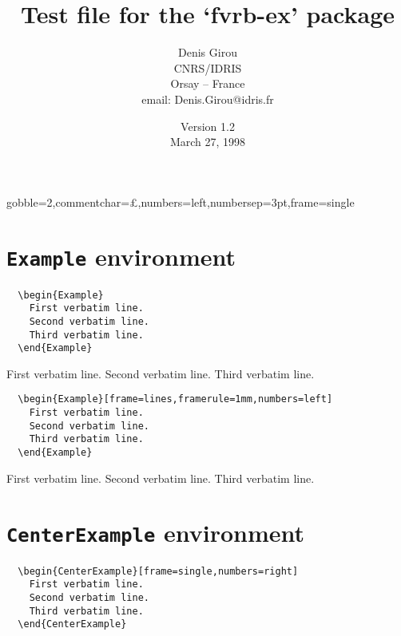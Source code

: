 \documentclass{article}
\begin{document}
\title{Test file for the `\textsf{fvrb-ex}' package}
\author{Denis Girou\\CNRS/IDRIS\\Orsay -- France\\
        {\footnotesize email: Denis.Girou@idris.fr}}
\date{Version 1.2\\March 27, 1998}

\maketitle

  {gobble=2,commentchar=^^a3,numbers=left,numbersep=3pt,frame=single}

\section{\texttt{Example} environment}

\begin{Verbatim}
  \begin{Example}
    First verbatim line.
    Second verbatim line.
    Third verbatim line.
  \end{Example}
\end{Verbatim}

\begin{Example}
  First verbatim line.
  Second verbatim line.
  Third verbatim line.
\end{Example}

\begin{Verbatim}
  \begin{Example}[frame=lines,framerule=1mm,numbers=left]
    First verbatim line.
    Second verbatim line.
    Third verbatim line.
  \end{Example}
\end{Verbatim}

\begin{Example}[frame=lines,framerule=1mm,numbers=left]
  First verbatim line.
  Second verbatim line.
  Third verbatim line.
\end{Example}

\section{\texttt{CenterExample} environment}

\begin{Verbatim}
  \begin{CenterExample}[frame=single,numbers=right]
    First verbatim line.
    Second verbatim line.
    Third verbatim line.
  \end{CenterExample}
\end{Verbatim}
\end{document}
